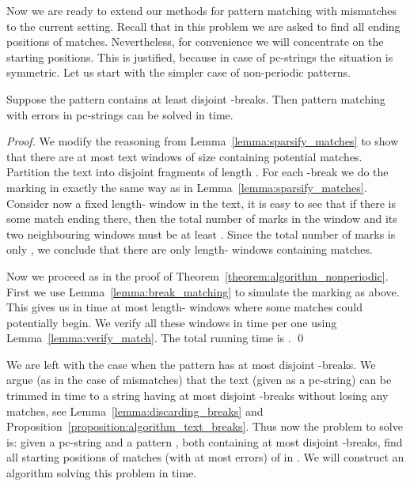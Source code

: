 \documentclass[runningheads]{llncs}
\begin{document}
Now we are ready to extend our methods for pattern matching with mismatches to the current setting. Recall that in this problem we are asked to find all ending positions of matches. Nevertheless, for convenience we will concentrate on the starting positions. This is justified, because in case of pc-strings the situation is symmetric. Let us start with the simpler case of non-periodic patterns.
\begin{theorem}\label{theorem:algorithm_errors_nonperiodic}
Suppose the pattern contains at least  disjoint -breaks. Then pattern matching with  errors in pc-strings can be solved in  time.
\end{theorem}
\begin{proof}
We modify the reasoning from Lemma~\ref{lemma:sparsify_matches} to show that there are at most  text windows of size  containing potential matches. Partition the text into disjoint fragments of length . For each -break  we do the marking in exactly the same way as in Lemma~\ref{lemma:sparsify_matches}. Consider now a fixed length- window in the text, it is easy to see that if there is some match ending there, then the total number of marks in the window and its two neighbouring windows must be at least . Since the total number of marks is only , we conclude that there are only  length- windows containing matches. 

Now we proceed as in the proof of Theorem~\ref{theorem:algorithm_nonperiodic}. First we use Lemma~\ref{lemma:break_matching} to simulate the marking as above. This gives us in  time at most  length- windows where some matches could potentially begin. We verify all these windows in  time per one using Lemma~\ref{lemma:verify_match}. The total running time is . 
\qed
\end{proof}

We are left with the case when the pattern has at most  disjoint -breaks. We argue (as in the case of mismatches) that the text (given as a pc-string) can be trimmed in  time to a string having at most  disjoint -breaks without losing any matches, see Lemma~\ref{lemma:discarding_breaks} and Proposition~\ref{proposition:algorithm_text_breaks}. Thus now the problem to solve is: given a pc-string  and a pattern , both containing at most  disjoint -breaks, find all starting positions of matches (with at most  errors) of  in . We will construct an algorithm solving this problem in  time.
\end{document}
